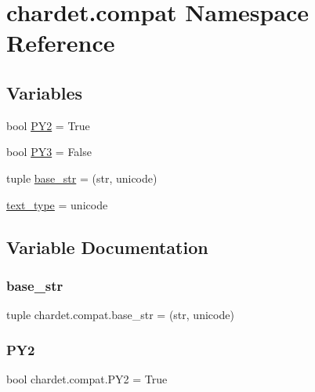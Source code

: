 \hypertarget{namespacechardet_1_1compat}{}\section{chardet.\+compat Namespace Reference}
\label{namespacechardet_1_1compat}
\subsection*{Variables}
\begin{DoxyCompactItemize}
\item 
bool \hyperlink{namespacechardet_1_1compat_a8ead10185a7ab6001a8ec664b07dde44}{P\+Y2} = True
\item 
bool \hyperlink{namespacechardet_1_1compat_a5ecb94f72532de1d1920fba67ee57454}{P\+Y3} = False
\item 
tuple \hyperlink{namespacechardet_1_1compat_a53420eec5ba3164a20df949811315909}{base\+\_\+str} = (str, unicode)
\item 
\hyperlink{namespacechardet_1_1compat_a627485b1185b42a3e9561204a8c485df}{text\+\_\+type} = unicode
\end{DoxyCompactItemize}


\subsection{Variable Documentation}
\mbox{\label{namespacechardet_1_1compat_a53420eec5ba3164a20df949811315909}} 
\subsubsection{\texorpdfstring{base\+\_\+str}{base\_str}}
{\footnotesize\ttfamily tuple chardet.\+compat.\+base\+\_\+str = (str, unicode)}

\mbox{\label{namespacechardet_1_1compat_a8ead10185a7ab6001a8ec664b07dde44}} 
\subsubsection{\texorpdfstring{P\+Y2}{PY2}}
{\footnotesize\ttfamily bool chardet.\+compat.\+P\+Y2 = True}


